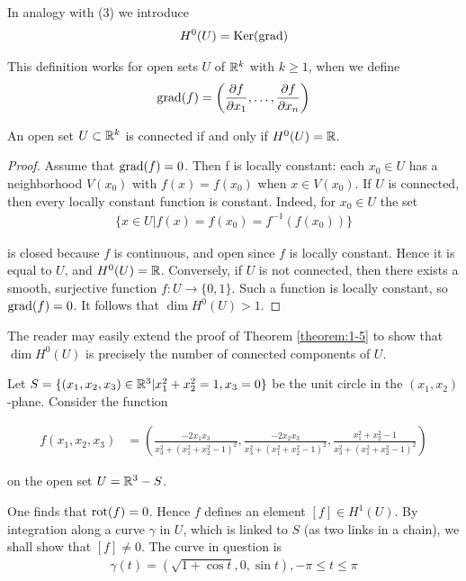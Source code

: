 In analogy with (3) we introduce
\begin{align}
  H^0(U) = \operatorname{Ker}(\operatorname{grad})
\end{align}

This definition works for open sets $U$ of $\mathbb{R}^k$ with $k\ge1$, when we define
\begin{align*}
  \operatorname{grad}(f) = \left(\frac{\partial f}{\partial x_1}, \ldots, \frac{\partial f}{\partial x_n}\right)
\end{align*}

\begin{theorem}\label{theorem:1-5}
  An open set $U\subset\mathbb{R}^k$ is connected if and only if $H^0(U) = \mathbb{R}$.
\end{theorem}

\begin{proof}
  Assume that $\operatorname{grad}(f) = 0$. Then f is locally constant: each $x_0\in U$ has
a neighborhood $V(x_0)$ with $f(x) = f(x_0)$ when $x\in V(x_0)$. If $U$ is connected,
then every locally constant function is constant. Indeed, for $x_0\in U$ the set
\begin{align*}
  \{x\in U|f(x) = f(x_0) = f^{-1}(f(x_0))\}
\end{align*}

is closed because $f$ is continuous, and open since $f$ is locally constant. Hence
it is equal to $U$, and $H^0(U) = \mathbb{R}$. Conversely, if $U$ is not connected, then there
exists a smooth, surjective function $f:U\to \{0, 1\}$. Such a function is locally
constant, so $\operatorname{grad}(f) = 0$. It follows that $\dim H^0(U) > 1$.
\end{proof}

The reader may easily extend the proof of Theorem \ref{theorem:1-5} to show that $\dim H^0(U)$
is precisely the number of connected components of $U$.

\begin{example}
  Let $S = \{(x_1, x_2, x_3)\in \mathbb{R}^3| x_1^2 + x_2^2 = 1, x_3 = 0\}$ be the unit circle
in the $(x_1, x_2)$-plane. Consider the function

\begin{align*}
  f(x_1,x_2,x_3)
  & = \left(\frac{-2x_1x_3}{x_3^2+\left(x_1^2+x_2^2-1\right)^2},\frac{-2x_2x_3}{x_3^2+\left(x_1^2+x_2^2-1\right)^2},\frac{x_1^2+x_2^2-1}{x_3^2+\left(x_1^2+x_2^2-1\right)^2}\right)
\end{align*}

on the open set $U = \mathbb{R}^3 - S$.
\end{example}

One finds that $\operatorname{rot}(f) = 0$. Hence $f$ defines an element $[f] \in H^1(U)$. By
integration along a curve $\gamma$ in $U$, which is linked to $S$ (as two links in a chain),
we shall show that $[f] \neq 0$. The curve in question is
\begin{align*}
  \gamma(t) = \left(\sqrt{1+\cos t}, 0, \sin t\right), -\pi\le t\le \pi
\end{align*}

